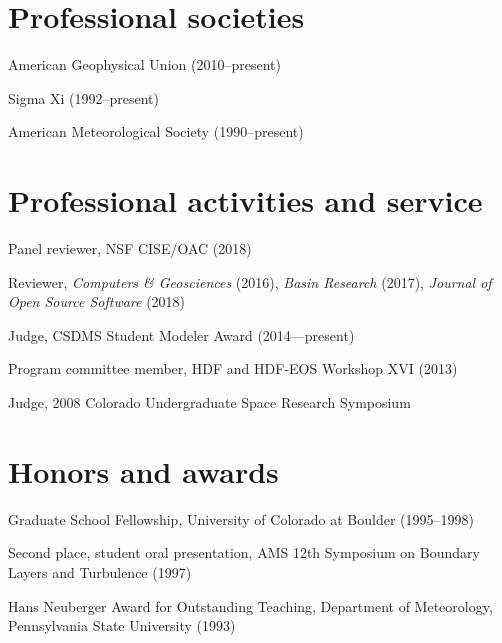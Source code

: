 \documentclass[letterpaper]{resume}
\begin{document}

\section{Professional societies}

\vspace{1.0em}
\begin{compactitem}[\itembullet]
  \item American Geophysical Union (2010--present) 
  \item Sigma Xi (1992--present)
  \item American Meteorological Society (1990--present)
\end{compactitem}


\section{Professional activities and service}

\vspace{1.0em}
\begin{compactitem}[\itembullet]
  \item Panel reviewer, NSF CISE/OAC (2018)
  \item Reviewer, \textit{Computers \& Geosciences} (2016),
    \textit{Basin Research} (2017), \textit{Journal of Open Source
      Software} (2018)
  \item Judge, CSDMS Student Modeler Award (2014---present)
  \item Program committee member, HDF and HDF-EOS Workshop XVI (2013)
  \item Judge, 2008 Colorado Undergraduate Space Research Symposium
\end{compactitem}


\section{Honors and awards}

\vspace{1.0em}
\begin{compactitem}[\itembullet]
  \item Graduate School Fellowship, University of Colorado
    at Boulder (1995--1998)
  \item Second place, student oral presentation, AMS 12th
    Symposium on Boundary Layers and Turbulence (1997)
  \item Hans Neuberger Award for Outstanding Teaching,
    Department of Meteorology, Pennsylvania State University (1993)
\end{compactitem}
\end{document}
